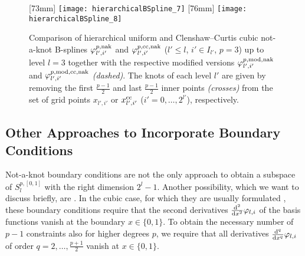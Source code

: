 \begin{figure}
  [73mm]{%
    \texttt{[image: hierarchicalBSpline\_7]}%
  }%
  \hfill
  [76mm]{%
    \texttt{[image: hierarchicalBSpline\_8]}%
  }%
  \caption{%
    Comparison of hierarchical uniform and Clenshaw--Curtis cubic not-a-knot
    B-splines $\varphi_{l',i'}^{p,\mathrm{nak}}$ and
    $\varphi_{l',i'}^{p,\mathrm{cc},\mathrm{nak}}$
    ($l ' \le l$, $i' \in I_{l'}$, $p = 3$) up to level $l = 3$
    together with the respective modified versions
    $\varphi_{l',i'}^{p,\mathrm{mod},\mathrm{nak}}$ and
    $\varphi_{l',i'}^{p,\mathrm{mod},\mathrm{cc},\mathrm{nak}}$
    \emph{(dashed)}.
    The knots of each level $l'$ are given by removing the
    first $\tfrac{p-1}{2}$ and last $\tfrac{p-1}{2}$
    inner points \emph{(crosses)}
    from the set of grid points $x_{l',i'}$ or
    $x_{l',i'}^{\mathrm{cc}}$
    ($i' = 0, \dotsc, 2^{l'}$), respectively.%
  }%
\end{figure}



\subsection{Other Approaches to Incorporate Boundary Conditions}

Not-a-knot boundary conditions are not the only approach
to obtain a subspace of $S_l^{p,[0,1]}$ with the right dimension $2^l - 1$.
Another possibility, which we want to discuss briefly, are
.
In the cubic case, for which they are usually formulated
\cite{Hoellig13Approximation},
these boundary conditions require that the
second derivatives $\frac{\mathop{}\!\mathrm{d}^2}{\mathop{}\!\mathrm{d}{}x^2} \varphi_{l,i}$ of the
basis functions vanish at the boundary $x \in \{0, 1\}$.
To obtain the necessary number of $p - 1$ constraints also
for higher degrees $p$,
we require that all derivatives
$\frac{\mathop{}\!\mathrm{d}^q}{\mathop{}\!\mathrm{d}{}x^q} \varphi_{l,i}$ of order
$q = 2, \dotsc, \tfrac{p+1}{2}$ vanish at $x \in \{0, 1\}$.

